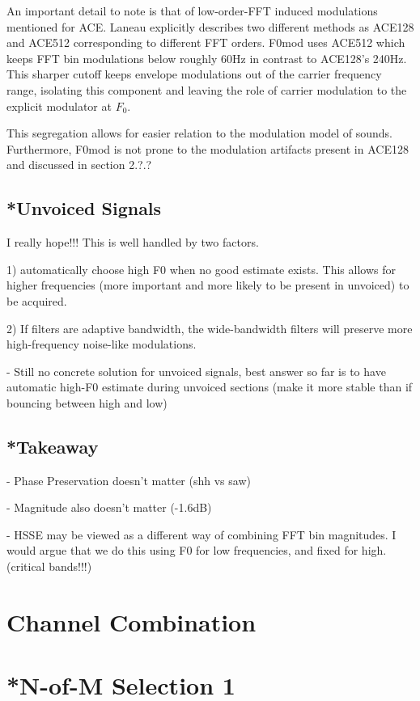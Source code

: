 \documentclass [11pt, proquest] {uwthesis}[2015/03/03]
\begin{document}
An important detail to note is that of low-order-FFT induced modulations mentioned for ACE.  Laneau explicitly describes two different methods as ACE128 and ACE512 corresponding to different FFT orders.  F0mod uses ACE512 which keeps FFT bin modulations below roughly 60Hz in contrast to ACE128's 240Hz.  This sharper cutoff keeps envelope modulations out of the carrier frequency range, isolating this component and leaving the role of carrier modulation to the explicit modulator at $F_0$.

This segregation allows for easier relation to the modulation model of sounds.  Furthermore, F0mod is not prone to the modulation artifacts present in ACE128 and discussed in section 2.?.?

\subsection{*Unvoiced Signals}

I really hope!!!  This is well handled by two factors.

1) automatically choose high F0 when no good estimate exists.  This allows for higher frequencies (more important and more likely to be present in unvoiced) to be acquired.

2) If filters are adaptive bandwidth, the wide-bandwidth filters will preserve more high-frequency noise-like modulations.


 - Still no concrete solution for unvoiced signals, best answer so far is to have automatic high-F0 estimate during unvoiced sections (make it more stable than if bouncing between high and low)

\subsection{*Takeaway}

 - Phase Preservation doesn't matter (shh vs saw)
 
 - Magnitude also doesn't matter (-1.6dB)
 
 - HSSE may be viewed as a different way of combining FFT bin magnitudes.  I would argue that we do this using F0 for low frequencies, and fixed for high.  (critical bands!!!)

\section{Channel Combination}

\section{*N-of-M Selection 1}
\end{document}
